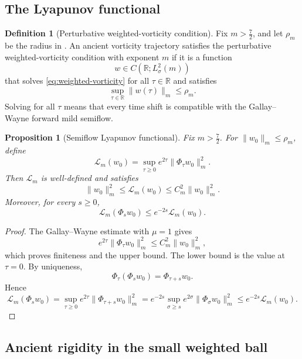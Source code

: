 \documentclass[11pt]{amsart}
\theoremstyle{plain}
\newtheorem{proposition}[theorem]{Proposition}
\theoremstyle{definition}
\newtheorem{definition}[theorem]{Definition}
\theoremstyle{remark}
\numberwithin{equation}{section}
\begin{document}
\subsection{The Lyapunov functional}

\begin{definition}[Perturbative weighted-vorticity condition]
\label{def:weighted-vorticity-condition}
Fix \(m>\frac72\), and let \(\rho_m\) be the radius in .
An ancient vorticity trajectory satisfies the perturbative
weighted-vorticity condition with exponent \(m\) if it is a function
\[
   w\in C(\mathbb R;L^2_\sigma(m))
\]
that solves \eqref{eq:weighted-vorticity} for all \(\tau\in\mathbb R\) and
satisfies
\[
   \sup_{\tau\in\mathbb R}\|w(\tau)\|_m\le\rho_m .
\]
Solving for all \(\tau\) means that every time shift is compatible with the
Gallay--Wayne forward mild semiflow.
\end{definition}

\begin{proposition}[Semiflow Lyapunov functional]\label{prop:weighted-lyap}
Fix \(m>\frac72\).  For \(\|w_0\|_m\le\rho_m\), define
\begin{equation}\label{eq:weighted-lyap}
   \mathcal L_m(w_0)
   =
   \sup_{\tau\ge0}e^{2\tau}\|\Phi_\tau w_0\|_m^2 .
\end{equation}
Then \(\mathcal L_m\) is well-defined and satisfies
\begin{equation}\label{eq:weighted-coercive}
   \|w_0\|_m^2
   \le
   \mathcal L_m(w_0)
   \le
   C_m^2\|w_0\|_m^2 .
\end{equation}
Moreover, for every \(s\ge0\),
\begin{equation}\label{eq:weighted-contract}
   \mathcal L_m(\Phi_s w_0)
   \le
   e^{-2s}\mathcal L_m(w_0).
\end{equation}
\end{proposition}

\begin{proof}
The Gallay--Wayne estimate with \(\mu=1\) gives
\[
   e^{2\tau}\|\Phi_\tau w_0\|_m^2
   \le C_m^2\|w_0\|_m^2,
\]
which proves finiteness and the upper bound.  The lower bound is the value at
\(\tau=0\).  By uniqueness,
\[
   \Phi_\tau(\Phi_s w_0)=\Phi_{\tau+s}w_0 .
\]
Hence
\[
   \mathcal L_m(\Phi_s w_0)
   =
   \sup_{\tau\ge0}e^{2\tau}\|\Phi_{\tau+s}w_0\|_m^2
   =
   e^{-2s}\sup_{\sigma\ge s}e^{2\sigma}\|\Phi_\sigma w_0\|_m^2
   \le e^{-2s}\mathcal L_m(w_0).
\]
\end{proof}

\subsection{Ancient rigidity in the small weighted ball}
\end{document}
